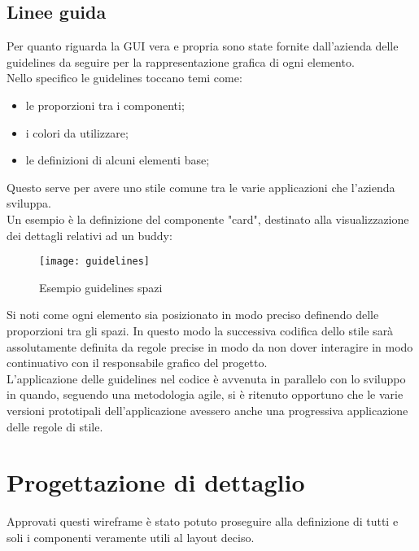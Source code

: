 \subsection{Linee guida}
Per quanto riguarda la GUI vera e propria sono state fornite dall'azienda delle 
guidelines da seguire per la rappresentazione grafica di ogni elemento. \\
Nello specifico le guidelines toccano temi come:
\begin{itemize}
	\item le proporzioni tra i componenti;
	\item i colori da utilizzare;
	\item le definizioni di alcuni elementi base;
\end{itemize}
Questo serve per avere uno stile comune tra le varie applicazioni che 
l'azienda sviluppa. \\
Un esempio è la definizione del componente "card", destinato alla 
visualizzazione dei dettagli relativi ad un buddy:
\begin{figure}[H] 
	\centering
	\texttt{[image: guidelines]}
	\caption{Esempio guidelines spazi}
\end{figure}
Si noti come ogni elemento sia posizionato in modo preciso definendo delle 
proporzioni tra gli spazi. In questo modo la successiva codifica dello stile sarà 
assolutamente definita da regole precise in modo da non dover interagire in modo 
continuativo con il responsabile grafico del progetto. \\
L'applicazione delle guidelines nel codice è avvenuta in parallelo con lo sviluppo 
in quando, seguendo una metodologia agile, si è ritenuto opportuno che le varie 
versioni prototipali dell'applicazione avessero anche una progressiva applicazione 
delle regole di stile.

\section{Progettazione di dettaglio}
Approvati questi wireframe è stato potuto proseguire alla definizione di tutti 
e soli i componenti veramente utili al layout deciso.